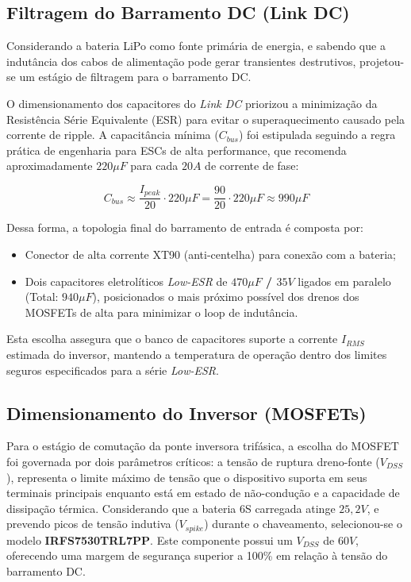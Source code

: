 \documentclass[12pt, a4paper, openright, oneside, brazilian]{abntex2}
\begin{document}
\subsection{Filtragem do Barramento DC (Link DC)}

Considerando a bateria LiPo como fonte primária de energia, e sabendo que a indutância dos cabos de alimentação pode gerar transientes destrutivos, projetou-se um estágio de filtragem para o barramento DC.

O dimensionamento dos capacitores do \textit{Link DC} priorizou a minimização da Resistência Série Equivalente (ESR) para evitar o superaquecimento causado pela corrente de ripple. A capacitância mínima ($C_{bus}$) foi estipulada seguindo a regra prática de engenharia para ESCs de alta performance, que recomenda aproximadamente $220\mu F$ para cada $20A$ de corrente de fase:

\begin{equation}
    C_{bus} \approx \frac{I_{peak}}{20} \cdot 220\mu F = \frac{90}{20} \cdot 220\mu F \approx 990 \mu F
\end{equation}

Dessa forma, a topologia final do barramento de entrada é composta por:
\begin{itemize}
    \item Conector de alta corrente XT90 (anti-centelha) para conexão com a bateria;
    \item Dois capacitores eletrolíticos \textit{Low-ESR} de \textbf{$470\mu F$ / $35V$} ligados em paralelo (Total: $940\mu F$), posicionados o mais próximo possível dos drenos dos MOSFETs de alta para minimizar o loop de indutância.
\end{itemize}

Esta escolha assegura que o banco de capacitores suporte a corrente $I_{RMS}$ estimada do inversor, mantendo a temperatura de operação dentro dos limites seguros especificados para a série \textit{Low-ESR}.

\subsection{Dimensionamento do Inversor (MOSFETs)}
Para o estágio de comutação da ponte inversora trifásica, a escolha do MOSFET foi governada por dois parâmetros críticos: a tensão de ruptura dreno-fonte ($V_{DSS}$), representa o limite máximo de tensão que o dispositivo suporta em seus terminais principais enquanto está em estado de não-condução e a capacidade de dissipação térmica. Considerando que a bateria 6S carregada atinge $25,2V$, e prevendo picos de tensão indutiva ($V_{spike}$) durante o chaveamento, selecionou-se o modelo \textbf{IRFS7530TRL7PP}. Este componente possui um $V_{DSS}$ de $60V$, oferecendo uma margem de segurança superior a 100\% em relação à tensão do barramento DC.
\end{document}
